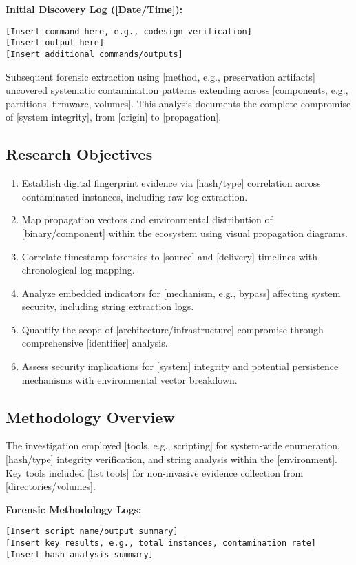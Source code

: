 \documentclass[12pt,a4paper]{article}
\begin{document}
\textbf{Initial Discovery Log ([Date/Time]):}
\begin{lstlisting}[style=terminal, caption={Initial Verification Failure}]
[Insert command here, e.g., codesign verification]
[Insert output here]
[Insert additional commands/outputs]
\end{lstlisting}

Subsequent forensic extraction using [method, e.g., preservation artifacts] uncovered systematic contamination patterns extending across [components, e.g., partitions, firmware, volumes]. This analysis documents the complete compromise of [system integrity], from [origin] to [propagation].

\subsection{Research Objectives}
\begin{enumerate}
    \item Establish digital fingerprint evidence via [hash/type] correlation across contaminated instances, including raw log extraction.
    \item Map propagation vectors and environmental distribution of [binary/component] within the ecosystem using visual propagation diagrams.
    \item Correlate timestamp forensics to [source] and [delivery] timelines with chronological log mapping.
    \item Analyze embedded indicators for [mechanism, e.g., bypass] affecting system security, including string extraction logs.
    \item Quantify the scope of [architecture/infrastructure] compromise through comprehensive [identifier] analysis.
    \item Assess security implications for [system] integrity and potential persistence mechanisms with environmental vector breakdown.
\end{enumerate}

\subsection{Methodology Overview}
The investigation employed [tools, e.g., scripting] for system-wide enumeration, [hash/type] integrity verification, and string analysis within the [environment]. Key tools included [list tools] for non-invasive evidence collection from [directories/volumes].

\textbf{Forensic Methodology Logs:}
\begin{lstlisting}[style=bash, caption={System-wide Enumeration Script Output}]
[Insert script name/output summary]
[Insert key results, e.g., total instances, contamination rate]
[Insert hash analysis summary]
\end{lstlisting}
\end{document}
